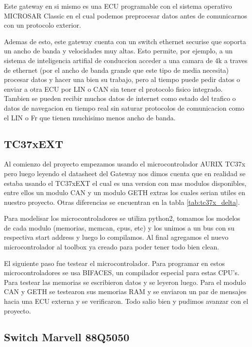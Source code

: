 Este gateway en si mismo es una ECU programable con el sistema operativo MICROSAR Classic en el cual podemos preprocesar datos antes de comunicarnos con un protocolo exterior. 

Ademas de esto, este gateway cuenta con un switch ethernet securise que soporta un ancho de banda y velocidades muy altas. Esto permite, por ejemplo, a un sistema de inteligencia artifial de conduccion acceder a una camara de 4k a traves de ethernet (por el ancho de banda grande que este tipo de media necesita) procesar datos y hacer una bien su trabajo, pero al tiempo puede pedir datos o enviar a otra ECU por LIN o CAN sin tener el protocolo fisico integrado. Tambien se pueden recibir muchos datos de internet como estado del trafico o datos de navegacion en tiempo real sin saturar protocolos de comunicacion como el LIN o Fr que tienen muchisimo menos ancho de banda.


\subsection{TC37xEXT}
Al comienzo del proyecto empezamos usando el microcontrolador AURIX TC37x \cite{aurix.tc37x} pero luego leyendo el datasheet del Gateway nos dimos cuenta que en realidad se estaba usando el TC37xEXT \cite{aurix.tc37e} el cual es una version con mas modulos disponibles, entre ellos un modulo CAN y un modulo GETH extras los cuales serian utiles en nuestro proyecto. Otras diferencias se encuentran en la tabla \ref{tab:tc37x_delta}.



Para modelisar los microcontroladores se utiliza python2, tomamos los modelos de cada modulo (memorias, mcmcan, cpus, etc) y los unimos a un bus con su respectiva start address y luego lo compilamos. Al final agregamos el nuevo microcontrolador al toolbox ya creado para poder tener todo bien clean.

El siguiente paso fue testear el microcontrolador. Para programar en estos microcontroladores se usa BIFACES, un compilador especial para estas CPU's. Para testear las memorias se escribieron datos y se leyeron luego. Para el modulo CAN y GETH se testearon sus memorias RAM y se enviaron un par de mensajes hacia una ECU externa  y se verificaron. Todo salio bien y pudimos avanzar con el proyecto.

\subsection{Switch Marvell 88Q5050}

